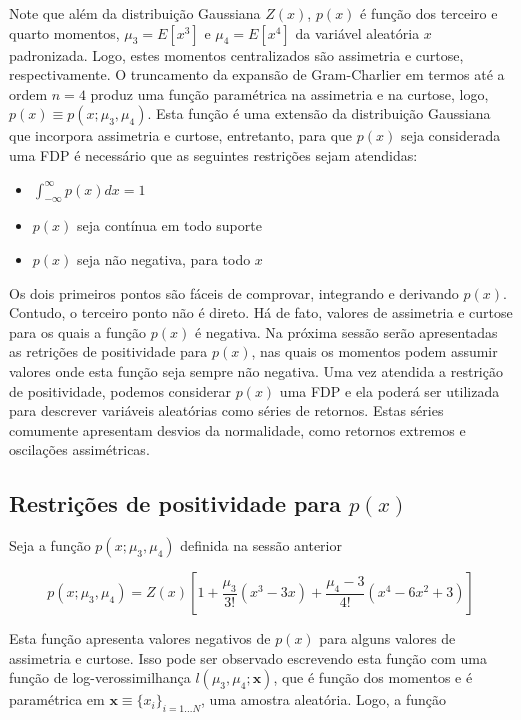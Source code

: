 \documentclass[]{article}
\providecommand{\tightlist}{%
  \setlength{\itemsep}{0pt}\setlength{\parskip}{0pt}}
\begin{document}
Note que além da distribuição Gaussiana \(Z(x)\), \(p(x)\) é função dos
terceiro e quarto momentos, \(\mu_3 = E[x^3]\) e \(\mu_4 = E[x^4]\) da
variável aleatória \(x\) padronizada. Logo, estes momentos centralizados
são assimetria e curtose, respectivamente. O truncamento da expansão de
Gram-Charlier em termos até a ordem \(n=4\) produz uma função
paramétrica na assimetria e na curtose, logo,
\(p(x) \equiv p(x;\mu_3,\mu_4)\). Esta função é uma extensão da
distribuição Gaussiana que incorpora assimetria e curtose, entretanto,
para que \(p(x)\) seja considerada uma FDP é necessário que as seguintes
restrições sejam atendidas:

\begin{itemize}
\tightlist
\item
  \(\int_{-\infty}^{\infty}p(x) dx = 1\)
\item
  \(p(x)\) seja contínua em todo suporte
\item
  \(p(x)\) seja não negativa, para todo \(x\)
\end{itemize}

Os dois primeiros pontos são fáceis de comprovar, integrando e derivando
\(p(x)\). Contudo, o terceiro ponto não é direto. Há de fato, valores de
assimetria e curtose para os quais a função \(p(x)\) é negativa. Na
próxima sessão serão apresentadas as retrições de positividade para
\(p(x)\), nas quais os momentos podem assumir valores onde esta função
seja sempre não negativa. Uma vez atendida a restrição de positividade,
podemos considerar \(p(x)\) uma FDP e ela poderá ser utilizada para
descrever variáveis aleatórias como séries de retornos. Estas séries
comumente apresentam desvios da normalidade, como retornos extremos e
oscilações assimétricas.

\subsection{\texorpdfstring{Restrições de positividade para
\(p(x)\)}{Restrições de positividade para p(x)}}\label{restricoes-de-positividade-para-px}

Seja a função \(p(x;\mu_3, \mu_4)\) definida na sessão anterior

\[
p(x; \mu_3, \mu_4) = Z(x)\left[ 1 + \frac{\mu_3}{3!} (x^3 - 3x) + \frac{\mu_4 - 3}{4!} (x^4 - 6x^2 + 3) \right]
\]

Esta função apresenta valores negativos de \(p(x)\) para alguns valores
de assimetria e curtose. Isso pode ser observado escrevendo esta função
com uma função de log-verossimilhança \(l(\mu_3, \mu_4; \mathbf{x})\),
que é função dos momentos e é paramétrica em
\(\mathbf{x} \equiv \{x_i\}_{i=1...N}\), uma amostra aleatória. Logo, a
função
\end{document}
